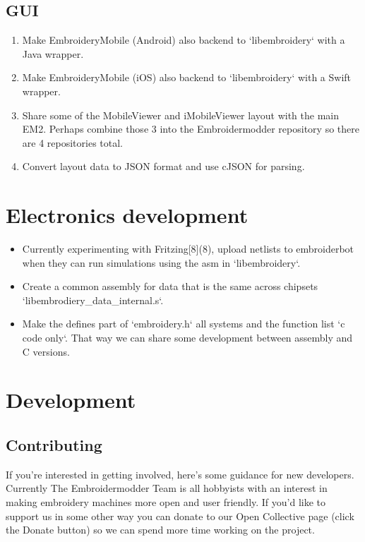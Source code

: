 \subsection{GUI}

\begin{enumerate}
\item Make EmbroideryMobile (Android) also backend to `libembroidery` with a Java wrapper.
\item Make EmbroideryMobile (iOS) also backend to `libembroidery` with a Swift wrapper.
\item Share some of the MobileViewer and iMobileViewer layout with the main EM2. Perhaps combine those 3 into the Embroidermodder repository so there are 4 repositories total.
\item Convert layout data to JSON format and use cJSON for parsing.
\end{enumerate}

\section{Electronics development}

\begin{itemize}
\item Currently experimenting with Fritzing[8](8), upload netlists to embroiderbot when they can run simulations using the asm in `libembroidery`.
\item Create a common assembly for data that is the same across chipsets `libembrodiery\_data\_internal.s`.
\item Make the defines part of `embroidery.h` all systems and the function list `c code only`. That way we can share some development between assembly and C versions.
\end{itemize}

\section{Development}

\subsection{Contributing}

If you're interested in getting involved, here's some guidance
for new developers. Currently The Embroidermodder Team is all
hobbyists with an interest in making embroidery machines more
open and user friendly. If you'd like to support us in some other way
you can donate to our Open Collective page (click the Donate button) so
we can spend more time working on the project.

